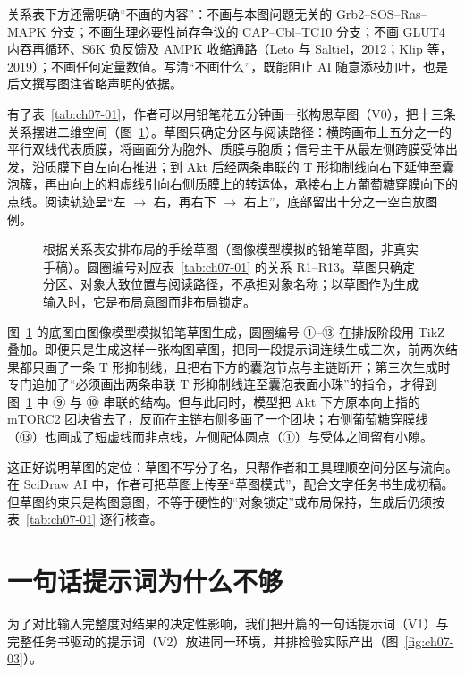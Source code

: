 关系表下方还需明确“不画的内容”：不画与本图问题无关的 Grb2–SOS–Ras–MAPK 分支；不画生理必要性尚存争议的 CAP–Cbl–TC10 分支；不画 GLUT4 内吞再循环、S6K 负反馈及 AMPK 收缩通路（Leto 与 Saltiel，2012；Klip 等，2019）；不画任何定量数值。写清“不画什么”，既能阻止 AI 随意添枝加叶，也是后文撰写图注省略声明的依据。

有了表~\ref{tab:ch07-01}，作者可以用铅笔花五分钟画一张构思草图（V0），把十三条关系摆进二维空间（图~\ref{fig:ch07-02}）。草图只确定分区与阅读路径：横跨画布上五分之一的平行双线代表质膜，将画面分为胞外、质膜与胞质；信号主干从最左侧跨膜受体出发，沿质膜下自左向右推进；到 Akt 后经两条串联的 T 形抑制线向右下延伸至囊泡簇，再由向上的粗虚线引向右侧质膜上的转运体，承接右上方葡萄糖穿膜向下的点线。阅读轨迹呈“左 $\rightarrow$ 右，再右下 $\rightarrow$ 右上”，底部留出十分之一空白放图例。

\begin{figure}[htbp]\centering

\caption{根据关系表安排布局的手绘草图（图像模型模拟的铅笔草图，非真实手稿）。圆圈编号对应表~\ref{tab:ch07-01} 的关系 R1–R13。草图只确定分区、对象大致位置与阅读路径，不承担对象名称；以草图作为生成输入时，它是布局意图而非布局锁定。}\label{fig:ch07-02}
\end{figure}

图~\ref{fig:ch07-02} 的底图由图像模型模拟铅笔草图生成，圆圈编号 ①–⑬ 在排版阶段用 TikZ 叠加。即便只是生成这样一张构图草图，把同一段提示词连续生成三次，前两次结果都只画了一条 T 形抑制线，且把右下方的囊泡节点与主链断开；第三次生成时专门追加了“必须画出两条串联 T 形抑制线连至囊泡表面小珠”的指令，才得到图~\ref{fig:ch07-02} 中 ⑨ 与 ⑩ 串联的结构。但与此同时，模型把 Akt 下方原本向上指的 mTORC2 团块省去了，反而在主链右侧多画了一个团块；右侧葡萄糖穿膜线（⑬）也画成了短虚线而非点线，左侧配体圆点（①）与受体之间留有小隙。

这正好说明草图的定位：草图不写分子名，只帮作者和工具理顺空间分区与流向。在 SciDraw AI 中，作者可把草图上传至“草图模式”，配合文字任务书生成初稿。但草图约束只是构图意图，不等于硬性的“对象锁定”或布局保持，生成后仍须按表~\ref{tab:ch07-01} 逐行核查。

\section{一句话提示词为什么不够}

为了对比输入完整度对结果的决定性影响，我们把开篇的一句话提示词（V1）与完整任务书驱动的提示词（V2）放进同一环境，并排检验实际产出（图~\ref{fig:ch07-03}）。

